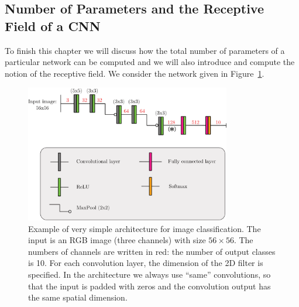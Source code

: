 \subsection*{Number of Parameters and the Receptive Field of a CNN}
To finish this chapter we will discuss how the total number of parameters of a
particular network can be computed and we will also introduce and compute the
notion of the receptive field. We consider the network given in
Figure~\ref{fig:cnn_arch}.

\begin{figure}[htpb]
  \centering \includegraphics[width=0.8\textwidth]{Figures/cnn_arch}
  \caption{Example of very simple architecture for image classification. The
    input is an RGB image (three channels) with size $56\times 56$. The numbers
    of channels are written in red: the number of output classes is 10. For each
    convolution layer, the dimension of the 2D filter is specified. In the
    architecture we always use ``same'' convolutions, so that the input is
    padded with zeros and the convolution output has the same spatial
    dimension.}%
  \label{fig:cnn_arch}
\end{figure}

